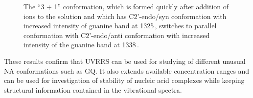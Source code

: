 \begin{figure}
	\centering
	
	\vspace{3mm}
	\caption[%
		Effect of standard anealing and incubation at 37\,\textdegree{}C on UVRRS
		of -Tel22.
	]{%
		The “3 + 1” conformation, which is formed quickly after addition of
		 ions to the solution and which has C2'-endo/syn conformation with
		increased intensity of guanine band at 1325\,\icm{}, switches to parallel
		conformation with C2'-endo/anti conformation with increased intensity of
		the guanine band at 1338\,\icm{}.
	}
	\label{\figlabel{telXXII:spectra}}
\end{figure}

These results confirm that UVRRS can be used for studying of
different unusual NA conformations such as GQ. It also extends available
concentration ranges and can be used for investigation of stability of
nucleic acid complexes while keeping structural information contained in the
vibrational spectra.
